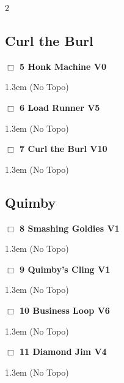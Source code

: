 \begin{multicols}{2}
\subsection*{Curl the Burl}\label{bf:Curl the Burl}
\needspace{2em}
\label{rt:Honk Machine}
\colorbox{green!20}{
\parbox{0.95\linewidth}{
\hspace{-1ex}\textbf{$\Box$
5 Honk Machine V0  
}}}
\begin{adjustwidth}{1.3em}{}			
  (No Topo)
\end{adjustwidth}
\needspace{2em}
\label{rt:Load Runner}
\colorbox{RoyalBlue!20}{
\parbox{0.95\linewidth}{
\hspace{-1ex}\textbf{$\Box$
6 Load Runner V5  
}}}
\begin{adjustwidth}{1.3em}{}			
  (No Topo)
\end{adjustwidth}
\needspace{2em}
\label{rt:Curl the Burl}
\colorbox{red!20}{
\parbox{0.95\linewidth}{
\hspace{-1ex}\textbf{$\Box$
7 Curl the Burl V10  
}}}
\begin{adjustwidth}{1.3em}{}			
  (No Topo)
\end{adjustwidth}
\needspace{10em}
\subsection*{Quimby}\label{bf:Quimby}
\needspace{2em}
\label{rt:Smashing Goldies}
\colorbox{green!20}{
\parbox{0.95\linewidth}{
\hspace{-1ex}\textbf{$\Box$
8 Smashing Goldies V1  \warn
}}}
\begin{adjustwidth}{1.3em}{}			
  (No Topo)
\end{adjustwidth}
\needspace{2em}
\label{rt:Quimby's Cling}
\colorbox{green!20}{
\parbox{0.95\linewidth}{
\hspace{-1ex}\textbf{$\Box$
9 Quimby's Cling V1  
}}}
\begin{adjustwidth}{1.3em}{}			
  (No Topo)
\end{adjustwidth}
\needspace{2em}
\label{rt:Business Loop}
\colorbox{RoyalBlue!20}{
\parbox{0.95\linewidth}{
\hspace{-1ex}\textbf{$\Box$
10 Business Loop V6  
}}}
\begin{adjustwidth}{1.3em}{}			
  (No Topo)
\end{adjustwidth}
\needspace{2em}
\label{rt:Diamond Jim}
\colorbox{RoyalBlue!20}{
\parbox{0.95\linewidth}{
\hspace{-1ex}\textbf{$\Box$
11 Diamond Jim V4  
}}}
\begin{adjustwidth}{1.3em}{}			
  (No Topo)
\end{adjustwidth}
\needspace{10em}

\end{multicols}
